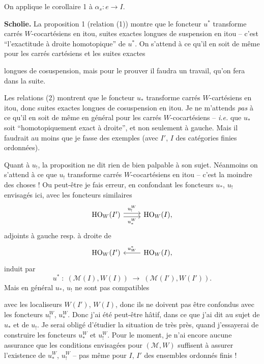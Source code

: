 \documentclass[11pt]{article}
\newcommand{\msp}[1]{\marginpar{\footnotesize [#1]}}
\newcommand{\M}{\mathcal{M}}
\newcommand{\HO}{\mathrm{HO}}
\begin{document}
On applique le corollaire 1 à $\alpha_s : e \longrightarrow I$.

\textbf{Scholie.} La proposition 1 (relation (1)) montre que le foncteur $u^*$ transforme carrés $W$-cocartésiens en itou, suites exactes longues de suspension en itou – c'est “l'exactitude à droite homotopique” de $u^*$. On s'attend à ce qu'il en soit de même pour les carrés cartésiens et les suites exactes

\noindent\msp{page 49}

\noindent longues de cosuspension, mais pour le prouver il faudra un travail, qu'on fera dans la suite.

Les relations (2) montrent que le foncteur $u_*$ transforme carrés $W$-cartésiens en itou, donc suites exactes longues de cosuspension en itou. Je ne m'attends \textit{pas} à ce qu'il en soit de même en général pour les carrés $W$-cocartésiens – \textit{i.e.} que $u_*$ soit “homotopiquement exact à droite”, et non seulement à gauche. Mais il faudrait au moins que je fasse des exemples (avec $I'$, $I$ des catégories finies ordonnées).

Quant à $u_{!}$, la proposition ne dit rien de bien palpable à son sujet. Néanmoins on s'attend à ce que $u_{!}$ transforme carrés $W$-cocartésiens en itou – c'est la moindre des choses ! Ou peut-être je fais erreur, en confondant les foncteurs $u_*$, $u_{!}$ envisagés ici, avec les foncteurs similaires
\[
\begin{tikzcd}
\HO_W(I') \arrow[r, shift left, "u_{!}^W"] \arrow[r, shift right, "u_*^W"'] & \HO_W(I),
\end{tikzcd}
\]
adjoints à gauche resp. à droite de
\[
\begin{tikzcd}
\HO_W(I') & \HO_W(I), \arrow[l, "u_W^*"']
\end{tikzcd}
\]
induit par
\[
u^* \;:\; (\M(I),W(I)) \;\longrightarrow\; (\M(I'),W(I')).
\]
Mais en général $u_*$, $u_{!}$ ne sont pas compatibles

\noindent\msp{page 50}

\noindent avec les localiseurs $W(I')$, $W(I)$, donc ils ne doivent pas être confondus avec les foncteurs $u_{!}^W$, $u_*^W$. Donc j'ai été peut-être hâtif, dans ce que j'ai dit au sujet de $u_*$ et de $u_{!}$. Je serai obligé d'étudier la situation de très près, quand j'essayerai de construire les foncteurs $u_*^W$ et $u_{!}^W$. Pour le moment, je n'ai encore aucune assurance que les conditions envisagées pour $(\M,W)$ suffisent à assurer l'existence de $u_*^W$, $u_{!}^W$ – pas même pour $I$, $I'$ des ensembles ordonnés finis !
\end{document}
